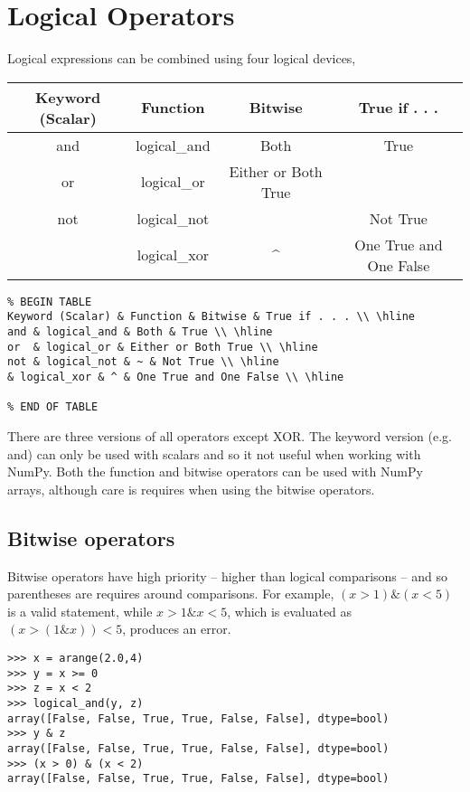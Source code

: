 \documentclass[KSmain.tex]{subfiles}
\begin{document}
 



\section{Logical Operators}

Logical expressions can be combined using four logical devices,
\begin{tabular}{|c|c|c|c|}
	\hline Keyword (Scalar) & Function & Bitwise & True if . . . \\ \hline
	and & logical\_and & Both & True \\ \hline
	or  & logical\_or & Either or Both True \\ \hline
	not & logical\_not & ~ & Not True \\ \hline
	& logical\_xor & \^ & One True and One False \\ \hline
\end{tabular} 
\begin{verbatim}
% BEGIN TABLE
Keyword (Scalar) & Function & Bitwise & True if . . . \\ \hline
and & logical_and & Both & True \\ \hline
or  & logical_or & Either or Both True \\ \hline
not & logical_not & ~ & Not True \\ \hline
& logical_xor & ^ & One True and One False \\ \hline

% END OF TABLE
\end{verbatim}
There are three versions of all operators except XOR. The keyword version (e.g. and) can only be used
with scalars and so it not useful when working with NumPy. Both the function and bitwise operators
can be used with NumPy arrays, although care is requires when using the bitwise operators.
 \subsection{Bitwise operators}
Bitwise operators have high priority – higher than logical comparisons – and so parentheses are requires around
comparisons. 
For example, $(x>1) \& (x<5)$ is a valid statement, while $x>1 \& x<5$, which is evaluated as
$(x>(1 \& x))<5$, produces an error.
\begin{framed}
\begin{verbatim}
>>> x = arange(2.0,4)
>>> y = x >= 0
>>> z = x < 2
>>> logical_and(y, z)
array([False, False, True, True, False, False], dtype=bool)
>>> y & z
array([False, False, True, True, False, False], dtype=bool)
>>> (x > 0) & (x < 2)
array([False, False, True, True, False, False], dtype=bool)
\end{verbatim}
\end{framed}
\end{document}

